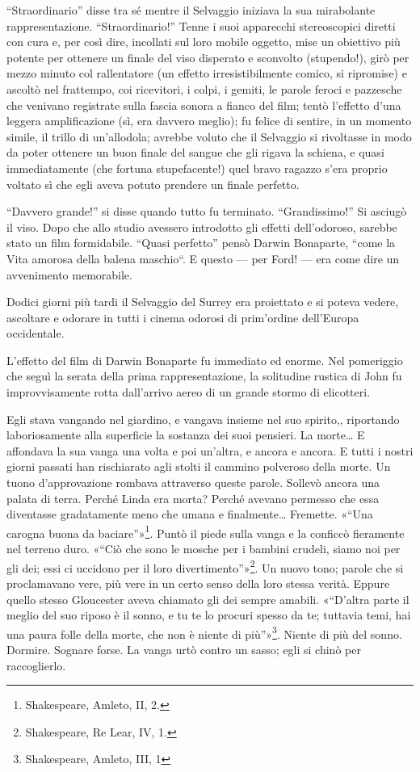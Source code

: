 \documentclass[
a5paper, %
10pt, %
twoside, 
onecolumn, %
openany, %
]{memoir}
\begin{document}
“Straordinario” disse tra sé mentre il Selvaggio iniziava la sua mirabolante rappresentazione. “Straordinario!” Tenne i suoi apparecchi stereoscopici diretti con cura e, per così dire, incollati sul loro mobile oggetto, mise un obiettivo più potente per ottenere un finale del viso disperato e sconvolto (stupendo!), girò per mezzo minuto col rallentatore (un effetto irresistibilmente comico, si ripromise) e ascoltò nel frattempo, coi ricevitori, i colpi, i gemiti, le parole feroci e pazzesche che venivano registrate sulla fascia sonora a fianco del film; tentò l’effetto d’una leggera amplificazione (sì, era davvero meglio); fu felice di sentire, in un momento simile, il trillo di un’allodola; avrebbe voluto che il Selvaggio si rivoltasse in modo da poter ottenere un buon finale del sangue che gli rigava la schiena, e quasi immediatamente (che fortuna stupefacente!) quel bravo ragazzo s’era proprio voltato sì che egli aveva potuto prendere un finale perfetto.

“Davvero grande!” si disse quando tutto fu terminato. “Grandissimo!” Si asciugò il viso. Dopo che allo studio avessero introdotto gli effetti dell’odoroso, sarebbe stato un film formidabile. “Quasi perfetto” pensò Darwin Bonaparte, “come la Vita amorosa della balena maschio“. E questo — per Ford! — era come dire un avvenimento memorabile.

Dodici giorni più tardi il Selvaggio del Surrey era proiettato e si poteva vedere, ascoltare e odorare in tutti i cinema odorosi di prim’ordine dell’Europa occidentale.

L’effetto del film di Darwin Bonaparte fu immediato ed enorme. Nel pomeriggio che seguì la serata della prima rappresentazione, la solitudine rustica di John fu improvvisamente rotta dall’arrivo aereo di un grande stormo di elicotteri.

Egli stava vangando nel giardino, e vangava insieme nel suo spirito,, riportando laboriosamente alla superficie la sostanza dei suoi pensieri. La morte… E affondava la sua vanga una volta e poi un’altra, e ancora e ancora. E tutti i nostri giorni passati han rischiarato agli stolti il cammino polveroso della morte. Un tuono d’approvazione rombava attraverso queste parole. Sollevò ancora una palata di terra. Perché Linda era morta? Perché avevano permesso che essa diventasse gradatamente meno che umana e finalmente… Fremette. «“Una carogna buona da baciare”»\footnote{Shakespeare, Amleto, II, 2.}. Puntò il piede sulla vanga e la conficcò fieramente nel terreno duro. «“Ciò che sono le mosche per i bambini crudeli, siamo noi per gli dei; essi ci uccidono per il loro divertimento”»\footnote{Shakespeare, Re Lear, IV, 1.}. Un nuovo tono; parole che si proclamavano vere, più vere in un certo senso della loro stessa verità. Eppure quello stesso Gloucester aveva chiamato gli dei sempre amabili. «“D’altra parte il meglio del suo riposo è il sonno, e tu te lo procuri spesso da te; tuttavia temi, hai una paura folle della morte, che non è niente di più”»\footnote{Shakespeare, Amleto, III, 1}. Niente di più del sonno. Dormire. Sognare forse. La vanga urtò contro un sasso; egli si chinò per raccoglierlo.
\end{document}
